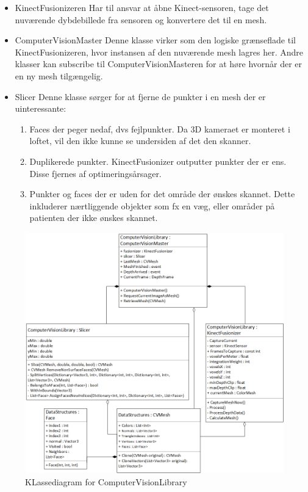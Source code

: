 \begin{itemize}
\item{KinectFusionizeren}\newline
Har til ansvar at åbne Kinect-sensoren, tage det nuværende dybdebillede fra sensoren og konvertere det til en mesh.

\item{ComputerVisionMaster}\newline
Denne klasse virker som den logiske grænseflade til KinectFusionizeren, hvor instansen af den nuværende mesh lagres her.
Andre klasser kan subscribe til ComputerVisionMasteren for at høre hvornår der er en ny mesh tilgængelig.

\item{Slicer}\newline
Denne klasse sørger for at fjerne de punkter i en mesh der er uinteressante:
\begin{enumerate}
\item{Faces der peger nedaf, dvs fejlpunkter. Da 3D kameraet er monteret i loftet, vil den ikke kunne se undersiden af det den skanner.}
\item{Duplikerede punkter. KinectFusionizer outputter punkter der er ens. Disse fjernes af optimeringsårsager.}
\item{Punkter og faces der er uden for det område der ønskes skannet. Dette inkluderer nærtliggende objekter som fx en væg, eller områder på patienten der ikke ønskes skannet.}
\end{enumerate}
\end{itemize}

\begin{figure}[H]
    \centering
    \includegraphics[width=1\textwidth]{figurer/d/Design/Class/uml_class_computervisionlibrary}
    \caption{KLassediagram for ComputerVisionLibrary}
    \label{class_ComputerVisionLib}
\end{figure}
\newpage


